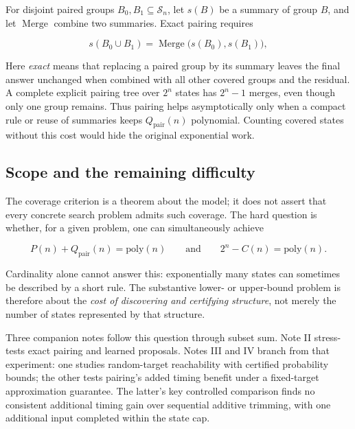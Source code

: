 \documentclass[
  10pt,
  english,
]{article}
\begin{document}
For disjoint paired groups \(B_0,B_1\subseteq\mathcal{S}_n\), let
\(s(B)\) be a summary of group \(B\), and let \(\operatorname{Merge}\)
combine two summaries. Exact pairing requires

\begin{tcolorbox}[accentbox]
\[
s(B_0\cup B_1)=\operatorname{Merge}\bigl(s(B_0),s(B_1)\bigr),
\]
\end{tcolorbox}

Here \emph{exact} means that replacing a paired group by its summary
leaves the final answer unchanged when combined with all other covered
groups and the residual. A complete explicit pairing tree over \(2^n\)
states has \(2^n-1\)
merges, even though only one group remains. Thus pairing helps
asymptotically only when a compact rule or reuse of summaries keeps
\(Q_{\mathrm{pair}}(n)\) polynomial. Counting covered states without
this cost would hide the original exponential work.

\hypertarget{scope-and-the-remaining-difficulty}{%
\subsection{Scope and the remaining
difficulty}\label{scope-and-the-remaining-difficulty}}

The coverage criterion is a theorem about the model; it does not assert
that every concrete search problem admits such coverage. The hard
question is whether, for a given problem, one can simultaneously achieve

\[
P(n)+Q_{\mathrm{pair}}(n) = \mathrm{poly}(n) \qquad\text{and}\qquad 2^n - C(n) = \mathrm{poly}(n).
\]

Cardinality alone cannot answer this: exponentially many states can
sometimes be described by a short rule. The substantive lower- or
upper-bound problem is therefore about the \emph{cost of discovering and
certifying structure}, not merely the number of states represented by
that structure.

Three companion notes follow this question through subset sum. Note II
stress-tests exact pairing and learned proposals. Notes III and IV branch
from that experiment: one studies random-target reachability with certified
probability bounds; the other tests pairing's added timing benefit under
a fixed-target approximation guarantee. The latter's key controlled
comparison finds no consistent additional timing gain over sequential
additive trimming, with one additional input completed within the state cap.
\end{document}

